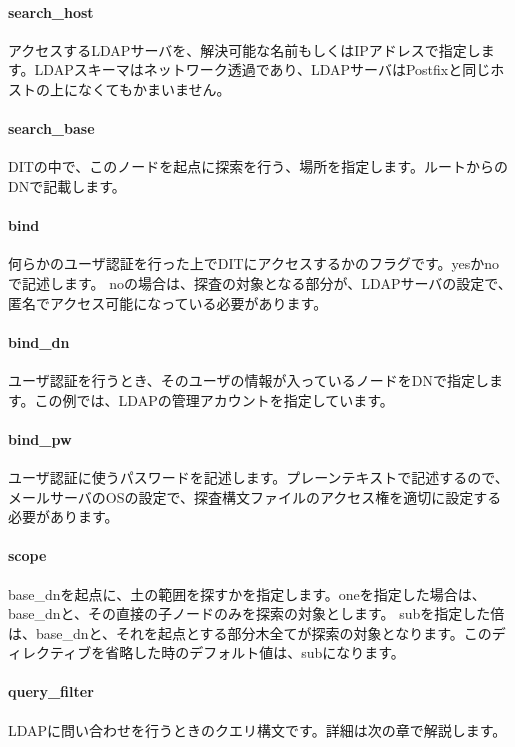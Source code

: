 \paragraph{search\_host}
アクセスするLDAPサーバを、解決可能な名前もしくはIPアドレスで指定します。LDAPスキーマはネットワーク透過であり、LDAPサーバはPostfixと同じホストの上になくてもかまいません。

\paragraph{search\_base}
DITの中で、このノードを起点に探索を行う、場所を指定します。ルートからのDNで記載します。

\paragraph{bind}
何らかのユーザ認証を行った上でDITにアクセスするかのフラグです。yesかnoで記述します。
noの場合は、探査の対象となる部分が、LDAPサーバの設定で、匿名でアクセス可能になっている必要があります。

\paragraph{bind\_dn}
ユーザ認証を行うとき、そのユーザの情報が入っているノードをDNで指定します。この例では、LDAPの管理アカウントを指定しています。

\paragraph{bind\_pw}
ユーザ認証に使うパスワードを記述します。プレーンテキストで記述するので、メールサーバのOSの設定で、探査構文ファイルのアクセス権を適切に設定する必要があります。

\paragraph{scope}
base\_dnを起点に、土の範囲を探すかを指定します。oneを指定した場合は、base\_dnと、その直接の子ノードのみを探索の対象とします。
subを指定した倍は、base\_dnと、それを起点とする部分木全てが探索の対象となります。このディレクティブを省略した時のデフォルト値は、subになります。

\paragraph{query\_filter}
LDAPに問い合わせを行うときのクエリ構文です。詳細は次の章で解説します。

